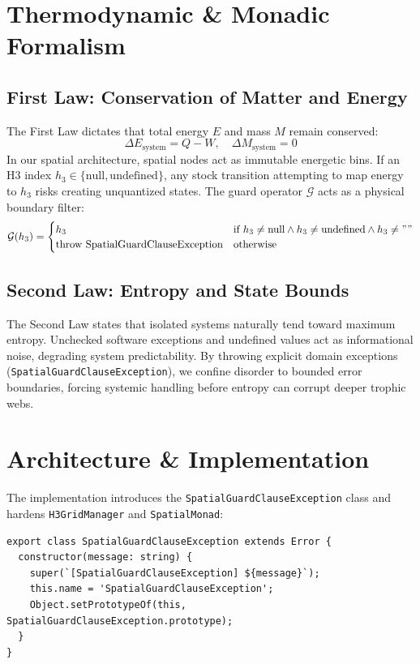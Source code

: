 \documentclass[11pt, a4paper]{article}
\begin{document}
\section{Thermodynamic \& Monadic Formalism}
\subsection{First Law: Conservation of Matter and Energy}
The First Law dictates that total energy $E$ and mass $M$ remain conserved:
\begin{equation}
\Delta E_{\text{system}} = Q - W, \quad \Delta M_{\text{system}} = 0
\end{equation}
In our spatial architecture, spatial nodes act as immutable energetic bins. If an H3 index $h_3 \in \{\text{null}, \text{undefined}\}$, any stock transition attempting to map energy to $h_3$ risks creating unquantized states. The guard operator $\mathcal{G}$ acts as a physical boundary filter:
\begin{equation}
\mathcal{G}(h_{3}) = \begin{cases} 
h_{3} & \text{if } h_{3} \neq \text{null} \land h_{3} \neq \text{undefined} \land h_{3} \neq "" \\
\text{throw } \text{SpatialGuardClauseException} & \text{otherwise}
\end{cases}
\end{equation}

\subsection{Second Law: Entropy and State Bounds}
The Second Law states that isolated systems naturally tend toward maximum entropy. Unchecked software exceptions and undefined values act as informational noise, degrading system predictability. By throwing explicit domain exceptions (\texttt{SpatialGuardClauseException}), we confine disorder to bounded error boundaries, forcing systemic handling before entropy can corrupt deeper trophic webs.

\section{Architecture \& Implementation}
The implementation introduces the \texttt{SpatialGuardClauseException} class and hardens \texttt{H3GridManager} and \texttt{SpatialMonad}:

\begin{lstlisting}
export class SpatialGuardClauseException extends Error {
  constructor(message: string) {
    super(`[SpatialGuardClauseException] ${message}`);
    this.name = 'SpatialGuardClauseException';
    Object.setPrototypeOf(this, SpatialGuardClauseException.prototype);
  }
}
\end{lstlisting}
\end{document}
